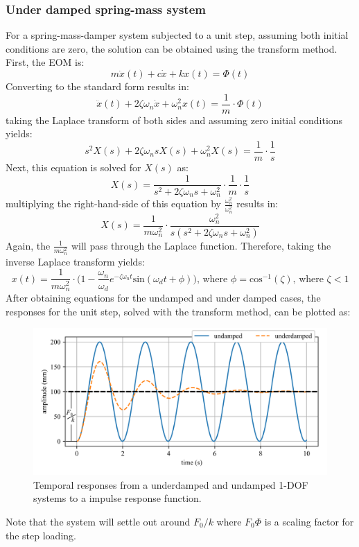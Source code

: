 \documentclass[12pt,letter]{article}
\numberwithin{ex}{section} %
\numberwithin{re}{section} %
\begin{document}
\subsubsection{Under damped spring-mass system}

For a spring-mass-damper system subjected to a unit step, assuming both initial conditions are zero, the solution can be obtained using the transform method. First, the EOM is:
\begin{equation}
m\ddot{x}(t) + c\dot{x} + kx(t) = \Phi(t)
\end{equation}
Converting to the standard form results in:
\begin{equation}
\ddot{x}(t) + 2  \zeta \omega_n\dot{x} + \omega_n^2x(t) = \frac{1}{m} \cdot \Phi(t)
\end{equation}
taking the Laplace transform of both sides and assuming zero initial conditions yields:
\begin{equation}
	s^2X(s) + 2  \zeta \omega_n s X(s) + \omega_n^2 X(s)  =\frac{1}{m} \cdot \frac{1}{s}
\end{equation}
Next, this equation is solved for $X(s)$ as:
\begin{equation}
	X(s) = \frac{1}{s^2 + 2  \zeta \omega_n s + \omega_n^2} \cdot \frac{1}{m} \cdot \frac{1}{s}
\end{equation}
multiplying the right-hand-side of this equation by  $\frac{\omega_n^2}{\omega_n^2}$ results in:
\begin{equation}
	X(s) = \frac{1}{m \omega_n^2} \cdot \frac{\omega_n^2}{s(s^2+2\zeta\omega_n s+\omega_n^2)}
\end{equation}
Again, the $\frac{1}{m\omega_n^2}$ will pass through the Laplace function. Therefore, taking the inverse Laplace transform yields:
\begin{equation}
	x(t) = \frac{1}{m \omega_n^2} \cdot \Big(1 - \frac{\omega_n}{\omega_d}e^{-\zeta \omega_n t}\text{sin}(\omega_dt + \phi)\Big)\text{, where } \phi = \text{cos}^{-1}(\zeta)\text{, where } \zeta<1
\end{equation}
After obtaining equations for the undamped and under damped cases, the responses for the unit step, solved with the transform method, can be plotted as:
\begin{figure}[H]
	\centering
	\includegraphics[]{../Figures/response_unit_step.png}
	\caption{Temporal responses from a underdamped and undamped 1-DOF systems to a impulse response function.}
\end{figure}
Note that the system will settle out around $F_0/k$ where $F_0  \Phi$ is a scaling factor for the step loading.
\end{document}
